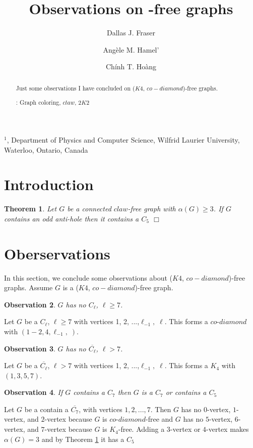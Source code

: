 \documentclass[12pt]{article}
\title{Observations on {\KCD}-free graphs}
\author{
	Dallas J. Fraser\inst{1}
	\and Ang\`ele M. Hamel'\inst{1}
	\and Ch\'inh T. Ho\`ang\inst{1}
}
\newtheorem{Theorem}{Theorem}[section]
\newtheorem{Observation}[Theorem]{Observation}
\def\inst#1{$^{#1}$}
\def\KCD{($K4$, $co-diamond$)}
\begin{document}
\maketitle

\begin{center}
{\footnotesize

\inst{1}, Department of Physics and Computer Science, Wilfrid Laurier
University, \\Waterloo, Ontario, Canada}

\end{center}

\begin{abstract}
Just some observations I have concluded on {\KCD}-free graphs.

: Graph coloring, $claw$, $2K2$
\end{abstract}


\section{Introduction}\label{sec:intro}

\begin{Theorem}\label{thm:ben-rebea}
Let $G$ be a connected $claw$-free graph with $\alpha(G) \geq 3$. If $G$ contains an odd anti-hole then it contains a $C_5$ $\Box$
\end{Theorem}

\section{Oberservations}\label{sec:observations}
In this section, we conclude some observations about {\KCD}-free graphs. Assume $G$ is a {\KCD}-free graph.
\begin{Observation}\label{obs:no-cl}
$G$ has no $C_\ell$, $\ell \geq 7$.
\end{Observation}
 Let $G$ be a $C_\ell$, $\ell \geq 7$ with vertices 1, 2, ...,$\ell_{-1},\; \ell$. This forms a $co$-$diamond$ with $(1-2, 4, \ell_{-1},\; )$.

\begin{Observation}\label{obs:no-anti-cl}
$G$ has no $\overline{C_\ell}$, $\ell > 7$.
\end{Observation}
 Let $G$ be a $\overline{C_\ell}$, $\ell > 7$ with vertices 1, 2, ...,$\ell_{-1},\; \ell$. This forms a $K_4$ with $(1, 3, 5, 7)$.

\begin{Observation}\label{obs:c7-has-c5}
If $G$ contains a $C_7$ then $G$ is a $C_7$ or contains a $C_5$ 
\end{Observation}
 Let $G$ be a contain a $\overline{C_7}$, with vertices $1, 2, ...,7$. Then $G$ has no $0$-vertex, $1$-vertex, and $2$-vertex because $G$ is $co$-$diamond$-free and $G$ has no $5$-vertex, $6$-vertex, and $7$-vertex because $G$ is $K_4$-free. Adding a $3$-vertex or $4$-vertex makes $\alpha(G) = 3$ and by Theorem \ref{thm:ben-rebea} it has a $C_5$
\end{document}
